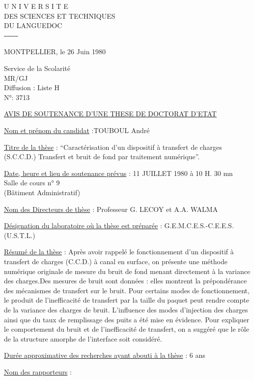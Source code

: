 
\begin{center}
U N I V E R S I T E\\
DES SCIENCES ET TECHNIQUES\\
DU LANGUEDOC\\
\texttt{------------}
\end{center}

MONTPELLIER, le 26 Juin 1980

Service de la Scolarité\\
MR/GJ\\
Diffusion : Liste H\\
N°: 3713

\uline{AVIS DE SOUTENANCE D'UNE THESE DE DOCTORAT D'ETAT}

\uline{Nom et prénom du candidat} :TOUBOUL André

\uline{Titre de la thèse} : ``Caractérisation d'un dispositif à transfert de charges (S.C.C.D.) Transfert et bruit de fond par traitement numérique''.

\uline{Date, heure et lieu de soutenance prévus} : 11 JUILLET 1980 à 10 H. 30 mn\\
Salle de cours n° 9\\
(Bâtiment Administratif)

\uline{Nom des Directeurs de thèse} : Professeur G. LECOY et A.A. WALMA

\uline{Désignation du laboratoire où la thèse est préparée} : G.E.M.C.E.S.-C.E.E.S. (U.S.T.L.)

\uline{Résumé de la thèse} : Après avoir rappelé le fonctionnement d'un dispositif à transfert de charges (C.C.D.) à canal en surface, on présente une méthode numérique originale de mesure du bruit de fond menant directement à la variance des charges.Des mesures de bruit sont données : elles montrent la prépondérance des mécanismes de transfert sur le bruit. Pour certains modes de fonctionnement, le produit de l'inefficacité de transfert par la taille du paquet peut rendre compte de la variance des charges de bruit. L'influence des modes d'injection des charges ainsi que du taux de remplissage des puits a été mise en évidence. Pour expliquer le comportement du bruit et de l'inefficacité de transfert, on a suggéré que le rôle de la structure amorphe de l'interface soit considéré.

\uline{Durée approximative des recherches ayant abouti à la thèse} : 6 ans

\uline{Nom des rapporteurs} :

